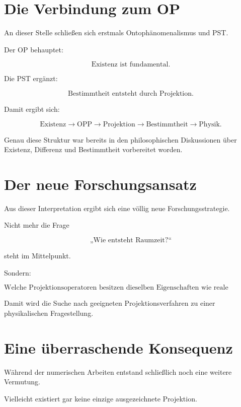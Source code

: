 \section*{Die Verbindung zum OP}

An dieser Stelle schließen sich erstmals Ontophänomenalismus und PST.

Der OP behauptet:

\[
\text{Existenz ist fundamental.}
\]

Die PST ergänzt:

\[
\text{Bestimmtheit entsteht durch Projektion.}
\]

Damit ergibt sich:

\[
\boxed{
\text{Existenz}
\rightarrow
\text{OPP}
\rightarrow
\text{Projektion}
\rightarrow
\text{Bestimmtheit}
\rightarrow
\text{Physik}.
}
\]

Genau diese Struktur war bereits in den philosophischen Diskussionen über Existenz, Differenz und Bestimmtheit vorbereitet worden.


\section*{Der neue Forschungsansatz}

Aus dieser Interpretation ergibt sich eine völlig neue Forschungsstrategie.

Nicht mehr die Frage

\[
\text{„Wie entsteht Raumzeit?“}
\]

steht im Mittelpunkt.

Sondern:

\[
\boxed{
\text{Welche Projektionsoperatoren besitzen dieselben Eigenschaften wie reale Beobachter?}
}
\]

Damit wird die Suche nach geeigneten Projektionsverfahren zu einer physikalischen Fragestellung.


\section*{Eine überraschende Konsequenz}

Während der numerischen Arbeiten entstand schließlich noch eine weitere Vermutung.

Vielleicht existiert gar keine einzige ausgezeichnete Projektion.

